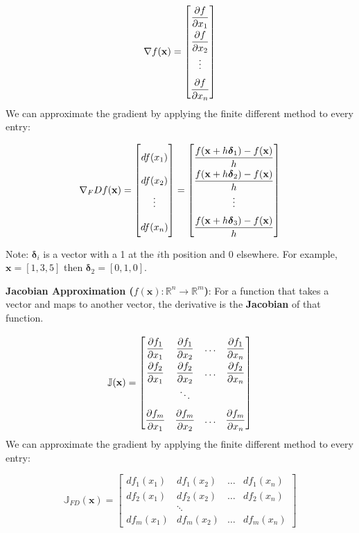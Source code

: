 \documentclass[12pt]{article}
\begin{document}
$$\displaystyle \nabla f(\mathbf{x}) = \renewcommand\arraystretch{2} \begin{bmatrix}
    \dfrac{\partial f}{\partial x_1}\\\dfrac{\partial f}{\partial x_2}\\ \vdots \\\dfrac{\partial f}{\partial x_n}
\end{bmatrix}$$
We can approximate the gradient by applying the finite different method to every entry:

$$\displaystyle \nabla_FD f(\mathbf{x}) = \begin{bmatrix}
    df(x_1) \\ df(x_2) \\ \vdots \\df(x_n)
\end{bmatrix} = \renewcommand\arraystretch{2} \begin{bmatrix}
    \dfrac{f(\mathbf{x} +h \boldsymbol{\delta}_1) - f(\mathbf{x})}{h} \\ 
    \dfrac{f(\mathbf{x} +h \boldsymbol{\delta}_2) - f(\mathbf{x})}{h} \\ 
    \vdots \\
    \dfrac{f(\mathbf{x} +h \boldsymbol{\delta}_3) - f(\mathbf{x})}{h}
\end{bmatrix}$$

Note: $\boldsymbol{\delta}_i$ is a vector with a 1 at the $i$th position and 0 elsewhere. For example, $\mathbf{x} = [1, 3, 5]$ then $\boldsymbol{\delta}_2 = [0, 1, 0]$.

\medskip
\noindent \textbf{Jacobian Approximation ($f(\mathbf{x}) : \mathbb{R}^n \to \mathbb{R}^m$)}: For a function that takes a vector and maps to another vector, the derivative is the \textbf{Jacobian} of that function.

$$\mathbb{J}(\mathbf{x}) = \renewcommand\arraystretch{2} \begin{bmatrix} \dfrac{\partial f_1}{\partial x_1} & \dfrac{\partial f_1}{\partial x_2} & \dots & \dfrac{\partial f_1}{\partial x_n}\\ \dfrac{\partial f_2}{\partial x_1} & \dfrac{\partial f_2}{\partial x_2} & \dots & \dfrac{\partial f_2}{\partial x_n} \\ & \ddots \\ \dfrac{\partial f_m}{\partial x_1} & \dfrac{\partial f_m}{\partial x_2} & \dots & \dfrac{\partial f_m}{\partial x_n} \end{bmatrix}$$
We can approximate the gradient by applying the finite different method to every entry:

$$\mathbb{J}_{FD}(\mathbf{x}) = \begin{bmatrix} df_1(x_1) & df_1(x_2) & \dots & df_1(x_n)\\ df_2(x_1) & df_2(x_2) & \dots & df_2(x_n) \\ & \ddots \\ df_m(x_1) & df_m(x_2) & \dots & df_m(x_n) \end{bmatrix}$$
\end{document}
